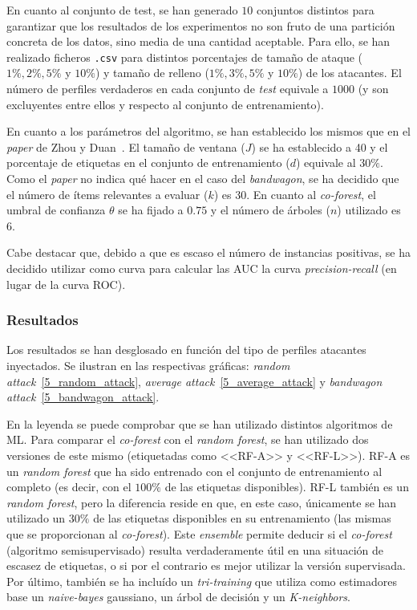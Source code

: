 En cuanto al conjunto de test, se han generado $10$ conjuntos distintos para garantizar que los resultados de los experimentos no son fruto de una partición concreta de los datos, sino media de una cantidad aceptable. Para ello, se han realizado ficheros \texttt{.csv} para distintos porcentajes de tamaño de ataque ($1\%, 2\%, 5\%$ y $10\%$) y tamaño de relleno ($1\%, 3\%, 5\%$ y $10\%$) de los atacantes. El número de perfiles verdaderos en cada conjunto de \textit{test} equivale a $1000$ (y son excluyentes entre ellos y respecto al conjunto de entrenamiento).

En cuanto a los parámetros del algoritmo, se han establecido los mismos que en el \textit{paper} de Zhou y Duan~\cite{zhou2021SemisupervisedRecommendationAttack}. El tamaño de ventana ($J$) se ha establecido a 40 y el porcentaje de etiquetas en el conjunto de entrenamiento ($d$) equivale al $30\%$. Como el \textit{paper} no indica qué hacer en el caso del \textit{bandwagon}, se ha decidido que el número de ítems relevantes a evaluar ($k$) es 30. En cuanto al \textit{co-forest}, el umbral de confianza $\theta$ se ha fijado a $0$.$75$ y el número de árboles ($n$) utilizado es 6.

Cabe destacar que, debido a que es escaso el número de instancias positivas, se ha decidido utilizar como curva para calcular las AUC la curva \textit{precision-recall} (en lugar de la curva ROC).

\subsubsection{Resultados}

Los resultados se han desglosado en función del tipo de perfiles atacantes inyectados. Se ilustran en las respectivas gráficas: \textit{random attack}~\ref{5_random_attack}, \textit{average attack}~\ref{5_average_attack} y \textit{bandwagon attack}~\ref{5_bandwagon_attack}.

En la leyenda se puede comprobar que se han utilizado distintos algoritmos de ML. Para comparar el \textit{co-forest} con el \textit{random forest}, se han utilizado dos versiones de este mismo (etiquetadas como <<RF-A>> y <<RF-L>>). RF-A es un \textit{random forest} que ha sido entrenado con el conjunto de entrenamiento al completo (es decir, con el $100\%$ de las etiquetas disponibles). RF-L también es un \textit{random forest}, pero la diferencia reside en que, en este caso, únicamente se han utilizado un $30\%$ de las etiquetas disponibles en su entrenamiento (las mismas que se proporcionan al \textit{co-forest}). Este \textit{ensemble} permite deducir si el \textit{co-forest} (algoritmo semisupervisado) resulta verdaderamente útil en una situación de escasez de etiquetas, o si por el contrario es mejor utilizar la versión supervisada. Por último, también se ha incluído un \textit{tri-training} que utiliza como estimadores base un \textit{naive-bayes} gaussiano, un árbol de decisión y un \textit{K-neighbors}.

